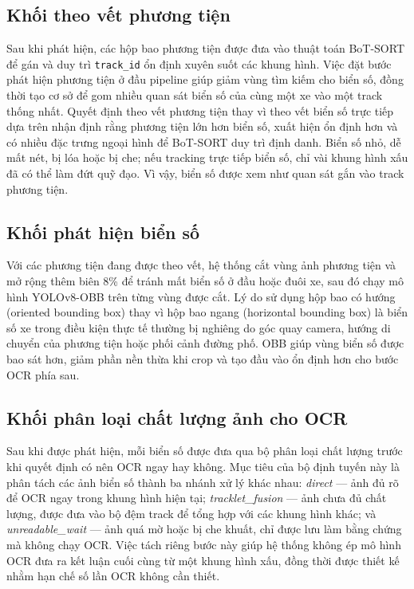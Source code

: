 \documentclass[../DoAn.tex]{subfiles}
\begin{document}
\subsection{Khối theo vết phương tiện}

Sau khi phát hiện, các hộp bao phương tiện được đưa vào thuật toán BoT-SORT để gán và duy trì  \texttt{track\_id} ổn định xuyên suốt các khung hình. Việc đặt bước phát hiện phương tiện ở đầu pipeline giúp giảm vùng tìm kiếm cho biển số, đồng thời tạo cơ sở để gom nhiều quan sát biển số của cùng một xe vào một track thống nhất. Quyết định theo vết phương tiện thay vì theo vết biển số trực tiếp dựa trên nhận định rằng phương tiện lớn hơn biển số, xuất hiện ổn định hơn và có nhiều đặc trưng ngoại hình để BoT-SORT duy trì định danh. Biển số nhỏ, dễ mất nét, bị lóa hoặc bị che; nếu tracking trực tiếp biển số, chỉ vài khung hình xấu đã có thể làm đứt quỹ đạo. Vì vậy, biển số được xem như quan sát gắn vào track phương tiện.

\subsection{Khối phát hiện biển số}

Với các phương tiện đang được theo vết, hệ thống cắt vùng ảnh phương tiện và mở rộng thêm biên 8\% để tránh mất biển số ở đầu hoặc đuôi xe, sau đó chạy mô hình YOLOv8-OBB trên từng vùng được cắt. Lý do sử dụng hộp bao có hướng (oriented bounding box) thay vì hộp bao ngang (horizontal bounding box) là biển số xe trong điều kiện thực tế thường bị nghiêng do góc quay camera, hướng di chuyển của phương tiện hoặc phối cảnh đường phố. OBB giúp vùng biển số được bao sát hơn, giảm phần nền thừa khi crop và tạo đầu vào ổn định hơn cho bước OCR phía sau.

\subsection{Khối phân loại chất lượng ảnh cho OCR}

Sau khi được phát hiện, mỗi biển số được đưa qua bộ phân loại chất lượng trước khi quyết định có nên OCR ngay hay không. Mục tiêu của bộ định tuyến này là phân tách các ảnh biển số thành ba nhánh xử lý khác nhau: \textit{direct} — ảnh đủ rõ để OCR ngay trong khung hình hiện tại; \textit{tracklet\_fusion} — ảnh chưa đủ chất lượng, được đưa vào bộ đệm track để tổng hợp với các khung hình khác; và \textit{unreadable\_wait} — ảnh quá mờ hoặc bị che khuất, chỉ được lưu làm bằng chứng mà không chạy OCR. Việc tách riêng bước này giúp hệ thống không ép mô hình OCR đưa ra kết luận cuối cùng từ một khung hình xấu, đồng thời được thiết kế nhằm hạn chế số lần OCR không cần thiết.
\end{document}
